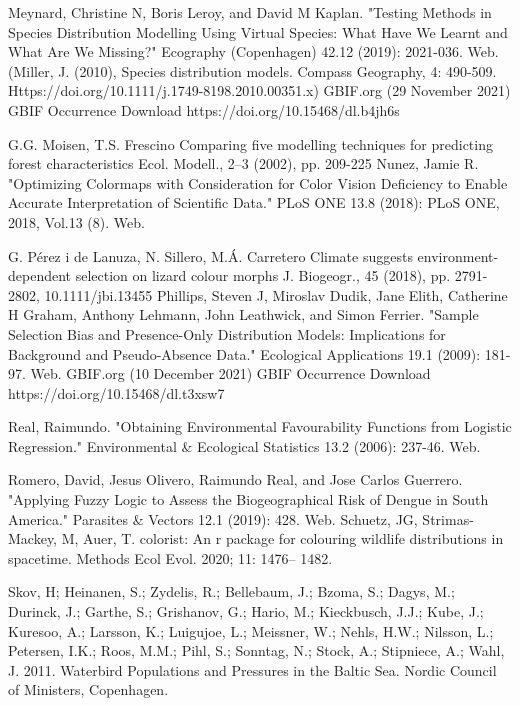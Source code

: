 \documentclass[12pt,a4paper]{article}
\begin{document}
\begin{thebibliography}{999}
Meynard, Christine N, Boris Leroy, and David M Kaplan. "Testing Methods in Species Distribution Modelling Using Virtual Species: What Have We Learnt and What Are We Missing?" Ecography (Copenhagen) 42.12 (2019): 2021-036. Web.
(Miller, J. (2010), Species distribution models. Compass Geography, 4: 490-509. Https://doi.org/10.1111/j.1749-8198.2010.00351.x)
GBIF.org (29 November 2021) GBIF Occurrence Download  https://doi.org/10.15468/dl.b4jh6s

G.G. Moisen, T.S. Frescino
Comparing five modelling techniques for predicting forest characteristics
Ecol. Modell., 2–3 (2002), pp. 209-225
Nunez, Jamie R. "Optimizing Colormaps with Consideration for Color Vision Deficiency to Enable Accurate Interpretation of Scientific Data." PLoS ONE 13.8 (2018): PLoS ONE, 2018, Vol.13 (8). Web.

G. Pérez i de Lanuza, N. Sillero, M.Á. Carretero
Climate suggests environment-dependent selection on lizard colour morphs
J. Biogeogr., 45 (2018), pp. 2791-2802, 10.1111/jbi.13455
Phillips, Steven J, Miroslav Dudik, Jane Elith, Catherine H Graham, Anthony Lehmann, John Leathwick, and Simon Ferrier. "Sample Selection Bias and Presence-Only Distribution Models: Implications for Background and Pseudo-Absence Data." Ecological Applications 19.1 (2009): 181-97. Web.
GBIF.org (10 December 2021) GBIF Occurrence Download  https://doi.org/10.15468/dl.t3xsw7



Real, Raimundo. "Obtaining Environmental Favourability Functions from Logistic Regression." Environmental & Ecological Statistics 13.2 (2006): 237-46. Web.


Romero, David, Jesus Olivero, Raimundo Real, and Jose Carlos Guerrero. "Applying Fuzzy Logic to Assess the Biogeographical Risk of Dengue in South America." Parasites & Vectors 12.1 (2019): 428. Web.
Schuetz, JG, Strimas-Mackey, M, Auer, T. colorist: An r package for colouring wildlife distributions in spacetime. Methods Ecol Evol. 2020; 11: 1476– 1482. 



Skov, H; Heinanen, S.; Zydelis, R.; Bellebaum, J.; Bzoma, S.; Dagys, M.; Durinck, J.; Garthe, S.; Grishanov, G.; Hario, M.; Kieckbusch, J.J.; Kube, J.; Kuresoo, A.; Larsson, K.; Luigujoe, L.; Meissner, W.; Nehls, H.W.; Nilsson, L.; Petersen, I.K.; Roos, M.M.; Pihl, S.; Sonntag, N.; Stock, A.; Stipniece, A.; Wahl, J. 2011. Waterbird Populations and Pressures in the Baltic Sea. Nordic Council of Ministers, Copenhagen.


\end{thebibliography}
\end{document}
